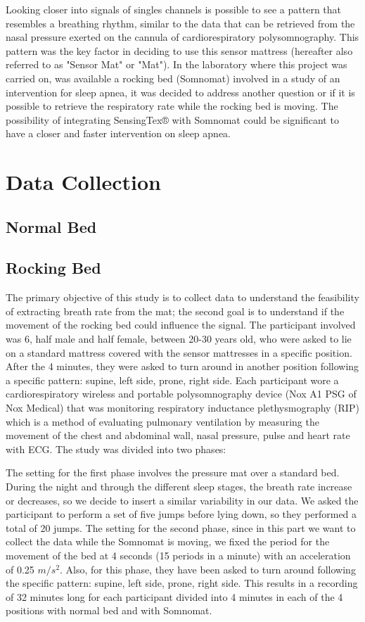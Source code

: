Looking closer into signals of singles channels is possible to see a pattern that resembles a breathing rhythm,  similar to the data that can
 be retrieved from the nasal pressure exerted on the cannula of cardiorespiratory polysomnography.
This pattern was the key factor in deciding to use this sensor mattress (hereafter also referred to as "Sensor Mat" or "Mat"). 
In the laboratory where this project was carried on, was available a rocking bed (Somnomat) involved in a study of an intervention for 
sleep apnea, it was decided to address another question or if it is possible to retrieve the respiratory rate while the rocking bed is moving.
The possibility of integrating SensingTex® with Somnomat could be significant to have a closer and faster intervention on sleep apnea.

\section{Data Collection}
\subsection{Normal Bed}
\subsection{Rocking Bed}

The primary objective of this study is to collect data to understand the feasibility of extracting breath rate from the mat; the second goal is to understand if the movement of the rocking bed could influence the signal.
The participant involved was 6, half male and half female, between 20-30 years old, who were asked to lie on a standard mattress covered with the sensor mattresses in a specific position. 
After the 4 minutes, they were asked to turn around in another position following a specific pattern: supine, left side, prone, right side.
Each participant wore a cardiorespiratory wireless and portable polysomnography device (Nox A1 PSG of Nox Medical) that was
monitoring respiratory inductance plethysmography (RIP) which is a method of evaluating pulmonary ventilation by measuring the movement of the chest and abdominal wall, nasal pressure, pulse and heart rate with ECG. 
The study was divided into two phases:

The setting for the first phase involves the pressure mat over a standard bed. During the night and through the different sleep stages, the breath rate increase or decreases, so we decide to insert a similar variability in our data. We asked the participant to perform a set of five jumps before lying down, so they performed a total of 20 jumps.
The setting for the second phase, since in this part we want to collect the data while the Somnomat is moving, we fixed the period for the movement of the bed at 4 seconds (15 periods in a minute) with an acceleration of 0.25 $m/s^2$. Also, for this phase, they have been asked to turn around following the specific pattern: supine, left side, prone, right side.
This results in a recording of 32 minutes long for each participant divided into 4 minutes in each of the 4 positions with normal bed and with Somnomat.

